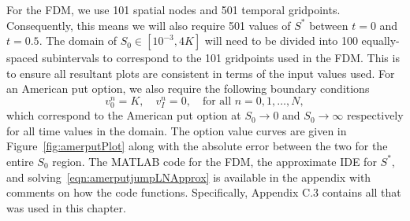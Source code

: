 For the FDM, we use 101 spatial nodes and 501 temporal gridpoints. Consequently, this means we will also require 501 values of $S^*$ between $t=0$ and $t=0.5$. The domain of $S_0 \in [10^{-3},4K]$ will need to be divided into 100 equally-spaced subintervals to correspond to the 101 gridpoints used in the FDM. This is to ensure all resultant plots are consistent in terms of the input values used. For an American put option, we also require the following boundary conditions
	$$
		v_0^n = K, \quad v_I^n = 0, \quad \text{for all } n = 0,1,\ldots,N,
	$$
which correspond to the American put option at $S_0 \rightarrow 0$ and $S_0 \rightarrow \infty$ respectively for all time values in the domain. The option value curves are given in Figure~\ref{fig:amerputPlot} along with the absolute error between the two for the entire $S_0$ region. The MATLAB code for the FDM, the approximate IDE for $S^*$, and solving~\eqref{eqn:amerputjumpLNApprox} is available in the appendix with comments on how the code functions. Specifically, Appendix C.3 contains all that was used in this chapter.
